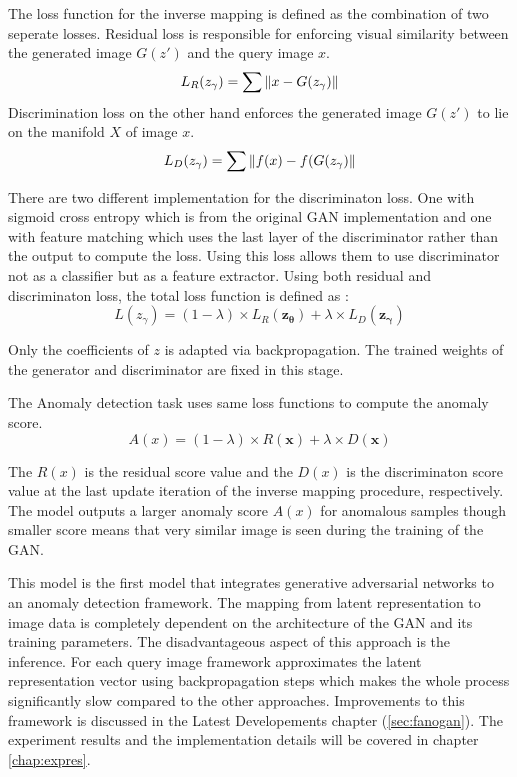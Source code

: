 The loss function for the inverse mapping is defined as the combination of two seperate losses.
Residual loss is responsible for enforcing visual similarity between the generated image
$G(z\prime)$ and the query image $x$.
\begin{equation}
    \label{eqn:anogan_rl}
    L_R (z_{\gamma}) = \sum \left\lVert x - G(z_{\gamma})\right\rVert
\end{equation} 
Discrimination loss on the other hand enforces the
generated image $G(z\prime)$ to lie on the manifold $X$ of image $x$.
\begin{equation}
    \label{eqn:anogan_dl}
    L_D (z_{\gamma}) = \sum  \left\lVert f(x) - f(G(z_{\gamma})\right\rVert
\end{equation}

There are two different implementation for the discriminaton loss. One with sigmoid cross entropy
which is from the original GAN implementation \cite{Goodfellow:2014:GAN:2969033.2969125} and one
with feature matching \cite{fm} which uses the last layer of the discriminator rather than the
output to compute the loss. Using this loss allows them to use discriminator not as a classifier but
as a feature extractor. Using both residual and discriminaton loss, the total loss function is
defined as :
$$L(z_{\gamma}) = (1 - \lambda ) \times L_{R}(\boldsymbol{z_{\theta}}) + \lambda \times
L_{D}(\boldsymbol{z_{\gamma}})$$

Only the coefficients of $z$ is adapted via backpropagation. The trained weights of the generator
and discriminator are fixed in this stage. \cite{Schlegl2017UnsupervisedAD}

The Anomaly detection task uses same loss functions to compute the anomaly score. 
$$A(x) = (1 - \lambda ) \times R(\boldsymbol{x}) + \lambda \times D(\boldsymbol{x}) $$

The $R(x)$ is the residual score value and the $D(x)$ is the discriminaton score value at the last
update iteration of the inverse mapping procedure, respectively. The model outputs a larger anomaly
score $A(x)$ for anomalous samples though smaller score means that very similar image is seen during
the training of the GAN. 

This model is the first model that integrates generative adversarial networks to an anomaly
detection framework. The mapping from latent representation to image data is completely dependent on
the architecture of the GAN and its training parameters. The disadvantageous aspect of this approach
is the inference. For each query image framework approximates the latent representation vector using
backpropagation steps which makes the whole process significantly slow compared to the other
approaches. Improvements to this framework is discussed in the Latest Developements chapter
(\ref{sec:fanogan}). The experiment results and the implementation details will be covered in
chapter \ref{chap:expres}.

